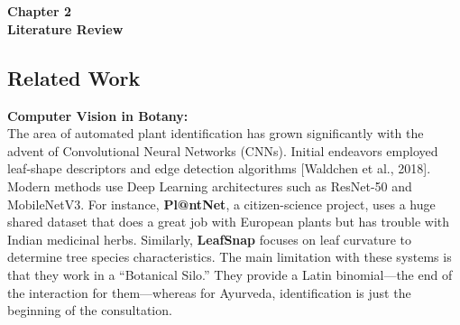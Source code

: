 
\titleformat{\chapter}[block]{\normalfont}{}{0pt}{}
\titlespacing{\chapter}{0pt}{-2em}{0pt}
\chapter[Literature Review]{}
\thispagestyle{fancy}

\vspace*{\fill}
\begin{center}
\textbf{\Huge{Chapter 2}}\\
\vspace{5mm}
\textbf{\Huge{Literature Review}}
\end{center}
\vspace*{\fill}
\newpage

\titleformat{\chapter}[display]{\vspace{1cm}\normalfont\Large\bfseries\centering}{\chaptertitlename\ \thechapter}{20pt}{\vspace{0pt}}
\titlespacing*{\chapter}{0pt}{-50pt}{20pt}

\justify
\section{Related Work}

\item \textbf{Computer Vision in Botany:} \\
The area of automated plant identification has grown significantly with the advent of Convolutional Neural Networks (CNNs). Initial endeavors employed leaf-shape descriptors and edge detection algorithms [Waldchen et al., 2018]. Modern methods use Deep Learning architectures such as ResNet-50 and MobileNetV3. For instance, \textbf{Pl@ntNet}, a citizen-science project, uses a huge shared dataset that does a great job with European plants but has trouble with Indian medicinal herbs. Similarly, \textbf{LeafSnap} focuses on leaf curvature to determine tree species characteristics. The main limitation with these systems is that they work in a ``Botanical Silo.'' They provide a Latin binomial---the end of the interaction for them---whereas for Ayurveda, identification is just the beginning of the consultation.


